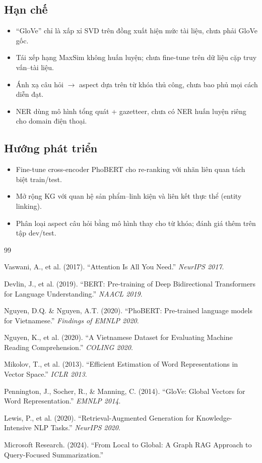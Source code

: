 \documentclass[12pt,a4paper]{article}
\begin{document}
\subsection{Hạn chế}
\begin{itemize}
  \item ``GloVe'' chỉ là xấp xỉ SVD trên đồng xuất hiện mức tài liệu, chưa phải GloVe gốc.
  \item Tái xếp hạng MaxSim không huấn luyện; chưa fine-tune trên dữ liệu cặp truy vấn--tài liệu.
  \item Ánh xạ câu hỏi $\to$ aspect dựa trên từ khóa thủ công, chưa bao phủ mọi cách diễn đạt.
  \item NER dùng mô hình tổng quát + gazetteer, chưa có NER huấn luyện riêng cho domain điện thoại.
\end{itemize}

\subsection{Hướng phát triển}
\begin{itemize}
  \item Fine-tune cross-encoder PhoBERT cho re-ranking với nhãn liên quan tách biệt train/test.
  \item Mở rộng KG với quan hệ sản phẩm--linh kiện và liên kết thực thể (entity linking).
  \item Phân loại aspect câu hỏi bằng mô hình thay cho từ khóa; đánh giá thêm trên tập dev/test.
\end{itemize}

\begin{thebibliography}{99}

Vaswani, A., et al. (2017). ``Attention Is All You Need.'' \textit{NeurIPS 2017}.

Devlin, J., et al. (2019). ``BERT: Pre-training of Deep Bidirectional Transformers for Language Understanding.'' \textit{NAACL 2019}.

Nguyen, D.Q. \& Nguyen, A.T. (2020). ``PhoBERT: Pre-trained language models for Vietnamese.'' \textit{Findings of EMNLP 2020}.

Nguyen, K., et al. (2020). ``A Vietnamese Dataset for Evaluating Machine Reading Comprehension.'' \textit{COLING 2020}.

Mikolov, T., et al. (2013). ``Efficient Estimation of Word Representations in Vector Space.'' \textit{ICLR 2013}.

Pennington, J., Socher, R., \& Manning, C. (2014). ``GloVe: Global Vectors for Word Representation.'' \textit{EMNLP 2014}.

Lewis, P., et al. (2020). ``Retrieval-Augmented Generation for Knowledge-Intensive NLP Tasks.'' \textit{NeurIPS 2020}.

Microsoft Research. (2024). ``From Local to Global: A Graph RAG Approach to Query-Focused Summarization.''

\end{thebibliography}
\end{document}
